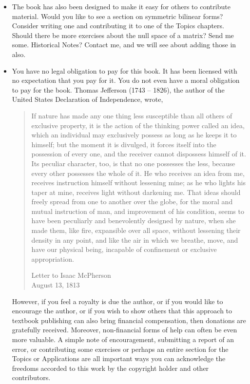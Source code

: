 \begin{itemize}
%
\item  The book has also been designed to make it easy for others to contribute material.   Would you like to see a section on symmetric bilinear forms?  Consider writing one and contributing it to one of the Topics chapters.  Should there be more exercises about the null space of a matrix?  Send me some.  Historical Notes?  Contact me, and we will see about adding those in also.
%
\item You have no legal obligation to pay for this book.  It has been licensed with no expectation that you pay for it.  You do not even have a moral obligation to pay for the book.  Thomas Jefferson (1743 -- 1826), the author of the United States Declaration of Independence, wrote,
%
\begin{quote}
If nature has made any one thing less susceptible than all others of exclusive property, it is the action of the thinking power called an idea, which an individual may exclusively possess as long as he keeps it to himself; but the moment it is divulged, it forces itself into the possession of every one, and the receiver cannot dispossess himself of it. Its peculiar character, too, is that no one possesses the less, because every other possesses the whole of it. He who receives an idea from me, receives instruction himself without lessening mine; as he who lights his taper at mine, receives light without darkening me. That ideas should freely spread from one to another over the globe, for the moral and mutual instruction of man, and improvement of his condition, seems to have been peculiarly and benevolently designed by nature, when she made them, like fire, expansible over all space, without lessening their density in any point, and like the air in which we breathe, move, and have our physical being, incapable of confinement or exclusive appropriation.
\begin{flushright}
Letter to Isaac McPherson\\
August 13, 1813
\end{flushright}
\end{quote}
%
However, if you feel a royalty is due the author, or if you would like to encourage the author, or if you wish to show others that this approach to textbook publishing can also bring financial compensation, then donations are gratefully received.  Moreover, non-financial forms of help can often be even more valuable.  A simple note of encouragement, submitting a report of an error, or contributing some exercises or perhaps an entire section for the Topics or Applications are all important ways you can acknowledge the freedoms accorded to this work by the copyright holder and other contributors.
%
\end{itemize}
%
